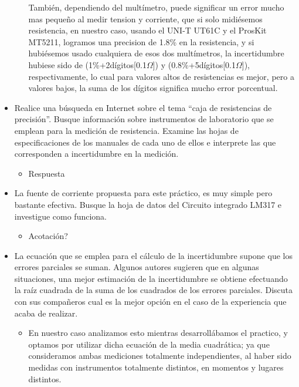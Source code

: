 \begin{itemize}
\begin{itemize}
        También, dependiendo del multímetro, puede significar un error mucho mas pequeño al medir tension y corriente, que si solo midiésemos resistencia, en nuestro caso, usando el UNI-T UT61C y el ProsKit MT5211, logramos una precision de 1.8\% en la resistencia, y si hubiésemos usado cualquiera de esos dos multímetros, la incertidumbre hubiese sido de (1\%+2dígitos[0.1$\Omega$]) y (0.8\%+5dígitos[0.1$\Omega$]), respectivamente, lo cual para valores altos de resistencias es mejor, pero a valores bajos, la suma de los dígitos significa mucho error porcentual.
    \end{itemize}
  \item Realice una búsqueda en Internet  sobre el tema “caja de resistencias de precisión”. Busque información sobre instrumentos de laboratorio que se emplean para la medición de resistencia. Examine las hojas de especificaciones de los  manuales  de cada uno de ellos e interprete las que corresponden a incertidumbre en la medición.
    \begin{itemize}
      \item Respuesta
    \end{itemize}
  \item La fuente de corriente propuesta para  este práctico, es muy simple pero bastante efectiva. Busque la hoja de datos del Circuito integrado LM317 e investigue como funciona.
    \begin{itemize}
      \item Acotación?
    \end{itemize}
  \item La ecuación que se emplea para el cálculo de la incertidumbre supone que los errores  parciales se suman. Algunos autores  sugieren que en algunas situaciones, una mejor estimación  de la incertidumbre se obtiene  efectuando la raíz cuadrada de la suma de los cuadrados de los errores parciales. Discuta con sus compañeros cual es la mejor opción en el caso de la experiencia que acaba de realizar.  
    \begin{itemize}
      \item En nuestro caso analizamos esto mientras desarrollábamos el practico, y optamos por utilizar dicha ecuación de la media cuadrática; ya que consideramos ambas mediciones totalmente independientes, al haber sido medidas con instrumentos totalmente distintos, en momentos y lugares distintos.
    \end{itemize}
\end{itemize}
